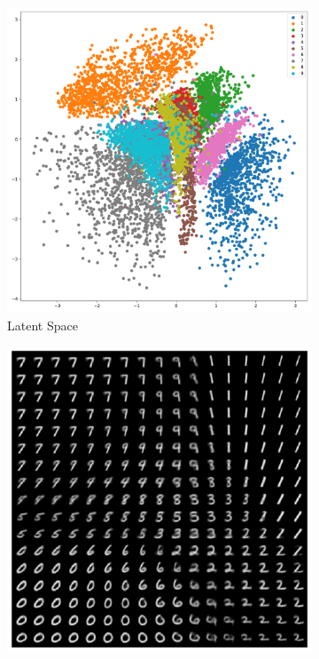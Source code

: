 \begin{figure}[hbt]
\begin{subfigure}{.5\textwidth}
  \centering
  \includegraphics[width=\textwidth]{gfx/evaluation/feature_space/distributions_mnist}
  \caption{Latent Space}
  \label{fig:mnist_latent_space}
\end{subfigure}%
\begin{subfigure}{.5\textwidth}
  \centering
  \includegraphics[width=\textwidth]{gfx/evaluation/feature_space/mnist_grid.pdf}

\end{subfigure}
\end{figure}
